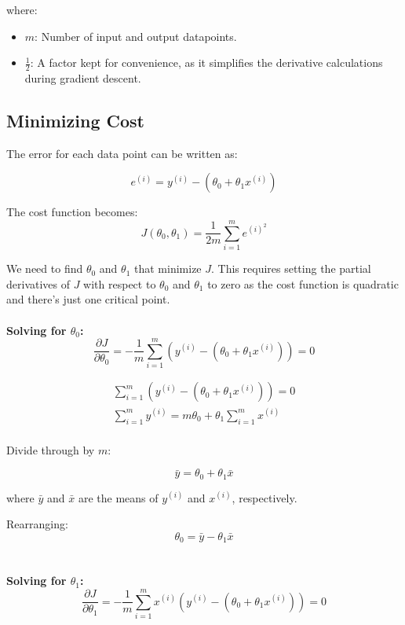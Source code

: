\noindent
where:
\begin{itemize}
    \item $m$: Number of input and output datapoints.
    \item $\frac{1}{2}$: A factor kept for convenience, as it simplifies the derivative calculations
    during gradient descent.
\end{itemize}

\subsection{Minimizing Cost}

The error for each data point can be written as:

\begin{equation}
    e^{(i)} = y^{(i)} - (\theta_0 + \theta_1 x^{(i)})
\end{equation}

The cost function becomes:
\begin{equation}
    J(\theta_0, \theta_1) = \frac{1}{2m} \sum_{i=1}^m e^{(i)^2}
\end{equation}

We need to find \(\theta_0\) and \(\theta_1\) that minimize \(J\). This requires setting the partial derivatives of
\(J\) with respect to \(\theta_0\) and \(\theta_1\) to zero as the cost function is quadratic and
there's just one critical point.
\\\\
\textbf{Solving for $\theta_0$:}
\begin{equation*}
    \frac{\partial J}{\partial \theta_0} = -\frac{1}{m} \sum_{i=1}^m \left( y^{(i)} - (\theta_0 + \theta_1 x^{(i)}) \right) = 0
\end{equation*}

\begin{gather*}
    \sum_{i=1}^m \left( y^{(i)} - (\theta_0 + \theta_1 x^{(i)}) \right) = 0\\
    \sum_{i=1}^m y^{(i)} = m\theta_0 + \theta_1 \sum_{i=1}^m x^{(i)}\\
\end{gather*}

Divide through by \(m\):

\[
\bar{y} = \theta_0 + \theta_1 \bar{x}
\]

where \(\bar{y}\) and \(\bar{x}\) are the means of \(y^{(i)}\) and \(x^{(i)}\), respectively.

Rearranging:
\begin{equation}
    \theta_0 = \bar{y} - \theta_1 \bar{x}
\end{equation}
\\\\
\textbf{Solving for $\theta_1$:}
\begin{equation*}
    \frac{\partial J}{\partial \theta_1} = -\frac{1}{m} \sum_{i=1}^m x^{(i)} \left( y^{(i)} -
    (\theta_0 + \theta_1 x^{(i)}) \right) = 0
\end{equation*}


